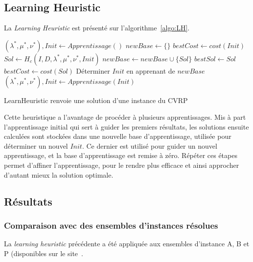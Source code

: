 \documentclass[a4paper,11pt]{article}%
\begin{document}
\subsection{Learning Heuristic}
La \emph{Learning Heuristic} est présenté sur l'algorithme~\ref{algo:LH}.

\begin{algorithm}
\DontPrintSemicolon %
$(\lambda^*,\mu^*,\nu^*), Init \gets Apprentissage()$\;
$newBase \gets \{\} $\;
$bestCost \gets cost(Init)$\;
 {
	$Sol \gets H_c(I,D,\lambda^*,\mu^*,\nu^*,Init)$\;
	$newBase \gets newBase \cup \{Sol\}$\;
	 {
		$bestSol \gets Sol$\;
		$bestCost \gets cost(Sol)$\;
	}
	 {
		Déterminer $Init$ en apprenant de $newBase$\;
		$(\lambda^*,\mu^*,\nu^*), Init \gets Apprentissage(Init)$\;
	}
}

\;
\caption{{\sc LearnHeuristic} renvoie une solution d'une instance du CVRP}
\label{algo:LH}
\end{algorithm}

Cette heuristique a l'avantage de procéder à plusieurs apprentissages. 
Mis à part l'apprentissage initial qui sert à guider les premiers résultats, les solutions ensuite calculées sont stockées dans une nouvelle base d'apprentissage, utilisée pour déterminer un nouvel $Init$.
Ce dernier est utilisé pour guider un nouvel apprentissage, et la base d'apprentissage est remise à zéro. 
Répéter ces étapes permet d'affiner l'apprentissage, pour le rendre plus efficace et ainsi approcher d'autant mieux la solution optimale.


\subsection{Résultats}

\subsubsection{Comparaison avec des ensembles d'instances résolues}

La \emph{learning heuristic} précédente a été appliquée aux ensembles d'instance A, B et P (disponibles sur le site~\cite{cvrplib}.
\end{document}
